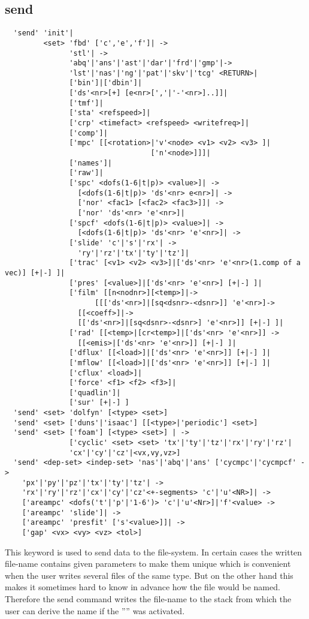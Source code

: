 \documentclass{article}
\begin{document}
\subsection{\label{send}send}
\begin{verbatim}
  'send' 'init'|
         <set> 'fbd' ['c','e','f']| ->
               'stl'| ->
               'abq'|'ans'|'ast'|'dar'|'frd'|'gmp'|->
               'lst'|'nas'|'ng'|'pat'|'skv'|'tcg' <RETURN>|
               ['bin']|['dbin']|
               ['ds'<nr>[+] [e<nr>[','|'-'<nr>]..]]|
               ['tmf']|
               ['sta' <refspeed>]|
               ['crp' <timefact> <refspeed> <writefreq>]|
               ['comp']|
               ['mpc' [[<rotation>|'v'<node> <v1> <v2> <v3> ]|
                                  ['n'<node>]]]|
               ['names']|
               ['raw']|
               ['spc' <dofs(1-6|t|p)> <value>]| ->
                 [<dofs(1-6|t|p)> 'ds'<nr> e<nr>]| ->
                 ['nor' <fac1> [<fac2> <fac3>]]| ->
                 ['nor' 'ds'<nr> 'e'<nr>]|
               ['spcf' <dofs(1-6|t|p)> <value>]| ->
                 [<dofs(1-6|t|p)> 'ds'<nr> 'e'<nr>]| ->
               ['slide' 'c'|'s'|'rx'| ->
                 'ry'|'rz'|'tx'|'ty'|'tz']|
               ['trac' [<v1> <v2> <v3>]|['ds'<nr> 'e'<nr>(1.comp of a vec)] [+|-] ]|
               ['pres' [<value>]|['ds'<nr> 'e'<nr>] [+|-] ]|
               ['film' [[n<nodnr>][<temp>]|->
                     [[['ds'<nr>]|[sq<dsnr>-<dsnr>]] 'e'<nr>]->
                 [[<coeff>]|->
                 [['ds'<nr>]|[sq<dsnr>-<dsnr>] 'e'<nr>]] [+|-] ]| 
               ['rad' [[<temp>|[cr<temp>]|['ds'<nr> 'e'<nr>]] ->
                 [[<emis>|['ds'<nr> 'e'<nr>]] [+|-] ]|
               ['dflux' [[<load>]|['ds'<nr> 'e'<nr>]] [+|-] ]|
               ['mflow' [[<load>]|['ds'<nr> 'e'<nr>]] [+|-] ]|
               ['cflux' <load>]| 
               ['force' <f1> <f2> <f3>]|
               ['quadlin']|
               ['sur' [+|-] ]
  'send' <set> 'dolfyn' [<type> <set>] 
  'send' <set> ['duns'|'isaac'] [[<type>|'periodic'] <set>] 
  'send' <set> ['foam'] [<type> <set>] | ->
               ['cyclic' <set> <set> 'tx'|'ty'|'tz'|'rx'|'ry'|'rz'|
               'cx'|'cy'|'cz'|<vx,vy,vz>] 
  'send' <dep-set> <indep-set> 'nas'|'abq'|'ans' ['cycmpc'|'cycmpcf' ->
    'px'|'py'|'pz'|'tx'|'ty'|'tz'| ->
    'rx'|'ry'|'rz'|'cx'|'cy'|'cz'<+-segments> 'c'|'u'<NR>]| ->
    ['areampc' <dofs('t'|'p'|'1-6')> 'c'|'u'<Nr>]|'f'<value> ->
    ['areampc' 'slide']| ->
    ['areampc' 'presfit' ['s'<value>]]| ->
    ['gap' <vx> <vy> <vz> <tol>] 
\end{verbatim}
This keyword is used to send data to the file-system. In certain cases the written file-name contains given parameters to make them unique which is convenient when the user writes several files of the same type. But on the other hand this makes it sometimes hard to know in advance how the file would be named. Therefore the send command writes the file-name to the stack from which the user can derive the name if the '''' was activated.
\end{document}
